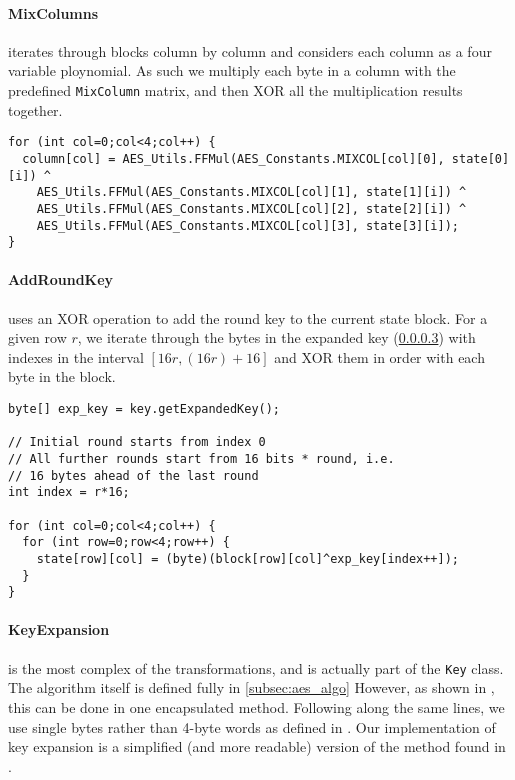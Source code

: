     \paragraph{MixColumns}
    
    iterates through blocks column by column and considers each column as a four variable ploynomial. As such we multiply each byte in a column with the predefined \verb!MixColumn! matrix, and then XOR all the multiplication results together.  \\
    
    \begin{lstlisting}
for (int col=0;col<4;col++) {
  column[col] = AES_Utils.FFMul(AES_Constants.MIXCOL[col][0], state[0][i]) ^
    AES_Utils.FFMul(AES_Constants.MIXCOL[col][1], state[1][i]) ^
    AES_Utils.FFMul(AES_Constants.MIXCOL[col][2], state[2][i]) ^
    AES_Utils.FFMul(AES_Constants.MIXCOL[col][3], state[3][i]);				
}
\end{lstlisting}
    
    \paragraph{AddRoundKey}
    
    uses an XOR operation to add the round key to the current state block. For a given row $r$, we iterate through the bytes in the expanded key (\textsection\ref{para:aes_keyexp}) with indexes in the interval $[16r,(16r)+16]$ and XOR them in order with each byte in the block. \\
    
    \begin{lstlisting}
byte[] exp_key = key.getExpandedKey();
		
// Initial round starts from index 0
// All further rounds start from 16 bits * round, i.e.
// 16 bytes ahead of the last round
int index = r*16; 
		
for (int col=0;col<4;col++) {
  for (int row=0;row<4;row++) {
    state[row][col] = (byte)(block[row][col]^exp_key[index++]);
  }
}
\end{lstlisting}
    
    \paragraph{KeyExpansion}
    \label{para:aes_keyexp}
    
    is the most complex of the transformations, and is actually part of the \verb!Key! class. The algorithm itself is defined fully in \textsection\ref{subsec:aes_algo} However, as shown in \cite{Wagner:2003ly}, this can be done in one encapsulated method. Following along the same lines, we use single bytes rather than 4-byte words as defined in \cite{Standards:2001aa}. Our implementation of key expansion is a simplified (and more readable) version of the method found in \cite{Wagner:2003ly}. \\
    
